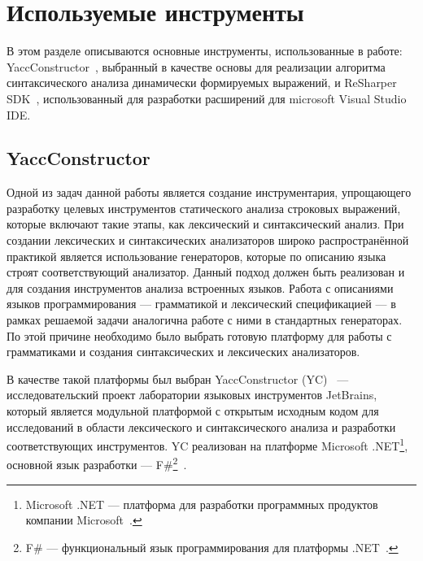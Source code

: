     
\section{Используемые инструменты}

В этом разделе описываются основные инструменты, использованные в работе: YaccConstructor~\cite{YCArticle, YCUrl}, выбранный в качестве основы для реализации алгоритма синтаксического анализа динамически формируемых выражений, и ReSharper SDK~\cite{ReSharperSDK}, использованный для разработки расширений для microsoft Visual Studio IDE.  

\subsection{YaccConstructor}\label{YCDescr}

    Одной из задач данной работы является создание инструментария, упрощающего разработку целевых инструментов статического анализа строковых выражений, которые включают такие этапы, как лексический и синтаксический анализ. При создании лексических и синтаксических анализаторов широко распространённой практикой является использование генераторов, которые по описанию языка строят соответствующий анализатор. Данный подход должен быть реализован и для создания инструментов анализа встроенных языков.
    Работа с описаниями языков программирования --- грамматикой и лексический спецификацией --- в рамках решаемой задачи аналогична работе с ними в стандартных генераторах. По этой причине необходимо было выбрать готовую платформу для работы с грамматиками и создания синтаксических и лексических анализаторов.

    В качестве такой платформы был выбран YaccConstructor (YC)~\cite{YCArticle, YCUrl} --- исследовательский проект лаборатории языковых инструментов JetBrains, который является модульной платформой с открытым исходным кодом для исследований в области лексического и синтаксического анализа и разработки соответствующих инструментов. YC реализован на платформе Microsoft .NET\footnote{Microsoft .NET --- платформа для разработки программных продуктов компании Microsoft~\cite{MSNETURL}.}, основной язык разработки --- F\#\footnote{F\# --- функциональный язык программирования для платформы .NET~\cite{FSharpURL}.}~\cite{FSharp}.

